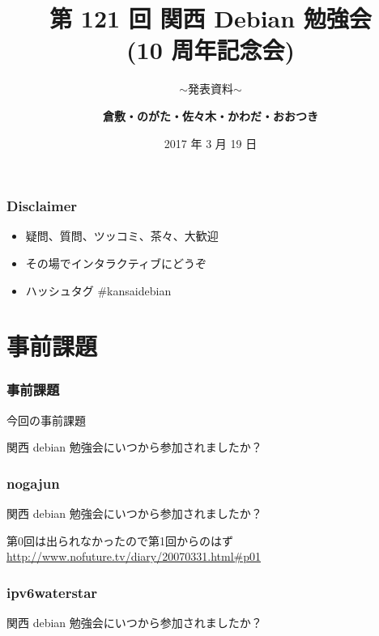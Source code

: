 \documentclass[cjk,dvipdfmx,10pt,compress,%
hyperref={bookmarks=true,bookmarksnumbered=true,bookmarksopen=false,%
colorlinks=false,%
pdftitle={第 121 回 関西 Debian 勉強会},%
pdfauthor={倉敷・のがた・佐々木・かわだ},%
pdfsubject={資料},%
}]{beamer}
\title{第 121 回 関西 Debian 勉強会\\(10 周年記念会)}
\subtitle{$\sim$発表資料$\sim$}
\author[かわだ てつたろう]{{\large\bf 倉敷・のがた・佐々木・かわだ・おおつき}}
\institute[Debian JP]{{\normalsize\tt 関西 Debian 勉強会}}
\date{{\small 2017 年 3 月 19 日}}
\begin{document}
\settitleslide
\begin{frame}
\titlepage
\end{frame}
\setdefaultslide

\begin{frame}[fragile]
  \frametitle{Disclaimer}
  \begin{itemize}
  \item 疑問、質問、ツッコミ、茶々、\alert{大歓迎}
  \item その場でインタラクティブにどうぞ
  \item ハッシュタグ \#kansaidebian
  \end{itemize}
\end{frame}



\section{事前課題}

\begin{frame}[fragile]
  \frametitle{事前課題}
  \begin{block}{今回の事前課題}
    \begin{description}
    \item 関西 debian 勉強会にいつから参加されましたか？
    \end{description}
  \end{block}
\end{frame}

\begin{frame}[fragile]
  \frametitle{nogajun}
    \begin{block}{関西 debian 勉強会にいつから参加されましたか？}
        \begin{description}
            \item 第0回は出られなかったので第1回からのはず
            \url{http://www.nofuture.tv/diary/20070331.html#p01}
        \end{description}
    \end{block}
\end{frame}

\begin{frame}[fragile]
  \frametitle{ipv6waterstar}
    \begin{block}{関西 debian 勉強会にいつから参加されましたか？}
        \begin{description}
            \item
        \end{description}
    \end{block}
\end{frame}
\end{document}
